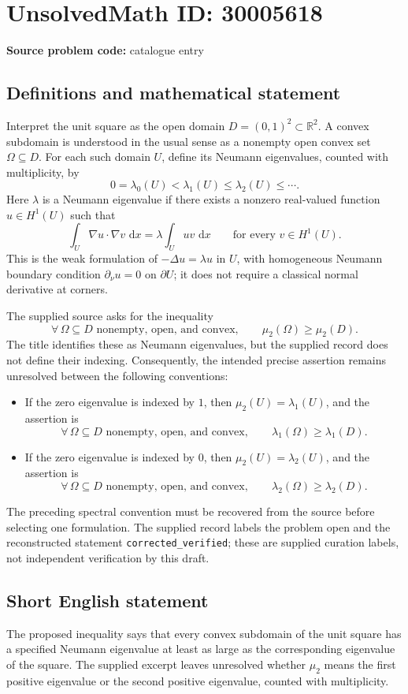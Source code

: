 \documentclass[11pt]{article}
\newcommand{\R}{\mathbb{R}}
\newcommand{\dd}{\,\mathrm{d}}
\begin{document}
\section*{UnsolvedMath ID: 30005618}
\textbf{Source problem code:} catalogue entry
\subsection{Definitions and mathematical statement}
Interpret the unit square as the open domain \(D=(0,1)^2\subset\R^2\). A convex subdomain is understood in the usual sense as a nonempty open convex set \(\Omega\subseteq D\). For each such domain \(U\), define its Neumann eigenvalues, counted with multiplicity, by
\[
0=\lambda_0(U)<\lambda_1(U)\leq\lambda_2(U)\leq\cdots.
\]
Here \(\lambda\) is a Neumann eigenvalue if there exists a nonzero real-valued function \(u\in H^1(U)\) such that
\[
\int_U \nabla u\cdot\nabla v\,\dd x
=\lambda\int_U uv\,\dd x
\qquad\text{for every }v\in H^1(U).
\]
This is the weak formulation of \(-\Delta u=\lambda u\) in \(U\), with homogeneous Neumann boundary condition \(\partial_\nu u=0\) on \(\partial U\); it does not require a classical normal derivative at corners.

The supplied source asks for the inequality
\[
\forall\,\Omega\subseteq D\text{ nonempty, open, and convex},
\qquad \mu_2(\Omega)\geq\mu_2(D).
\]
The title identifies these as Neumann eigenvalues, but the supplied record does not define their indexing. Consequently, the intended precise assertion remains unresolved between the following conventions:
\begin{itemize}
\item If the zero eigenvalue is indexed by \(1\), then \(\mu_2(U)=\lambda_1(U)\), and the assertion is
\[
\forall\,\Omega\subseteq D\text{ nonempty, open, and convex},
\qquad \lambda_1(\Omega)\geq\lambda_1(D).
\]
\item If the zero eigenvalue is indexed by \(0\), then \(\mu_2(U)=\lambda_2(U)\), and the assertion is
\[
\forall\,\Omega\subseteq D\text{ nonempty, open, and convex},
\qquad \lambda_2(\Omega)\geq\lambda_2(D).
\]
\end{itemize}
The preceding spectral convention must be recovered from the source before selecting one formulation. The supplied record labels the problem open and the reconstructed statement \texttt{corrected\_verified}; these are supplied curation labels, not independent verification by this draft.
\subsection{Short English statement}
The proposed inequality says that every convex subdomain of the unit square has a specified Neumann eigenvalue at least as large as the corresponding eigenvalue of the square. The supplied excerpt leaves unresolved whether \(\mu_2\) means the first positive eigenvalue or the second positive eigenvalue, counted with multiplicity.
\end{document}
